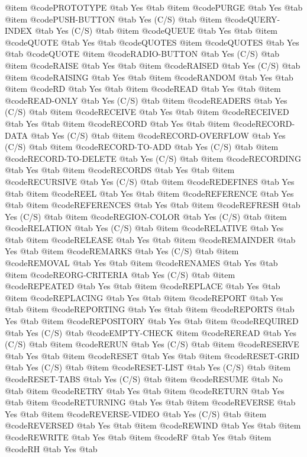 @item @code{PROTOTYPE} @tab Yes @tab 
@item @code{PURGE} @tab Yes @tab 
@item @code{PUSH-BUTTON} @tab Yes	(C/S) @tab 
@item @code{QUERY-INDEX} @tab Yes	(C/S) @tab 
@item @code{QUEUE} @tab Yes @tab 
@item @code{QUOTE} @tab Yes @tab @code{QUOTES}
@item @code{QUOTES} @tab Yes @tab @code{QUOTE}
@item @code{RADIO-BUTTON} @tab Yes	(C/S) @tab 
@item @code{RAISE} @tab Yes @tab 
@item @code{RAISED} @tab Yes	(C/S) @tab 
@item @code{RAISING} @tab Yes @tab 
@item @code{RANDOM} @tab Yes @tab 
@item @code{RD} @tab Yes @tab 
@item @code{READ} @tab Yes @tab 
@item @code{READ-ONLY} @tab Yes	(C/S) @tab 
@item @code{READERS} @tab Yes	(C/S) @tab 
@item @code{RECEIVE} @tab Yes @tab 
@item @code{RECEIVED} @tab Yes @tab 
@item @code{RECORD} @tab Yes @tab 
@item @code{RECORD-DATA} @tab Yes	(C/S) @tab 
@item @code{RECORD-OVERFLOW} @tab Yes	(C/S) @tab 
@item @code{RECORD-TO-ADD} @tab Yes	(C/S) @tab 
@item @code{RECORD-TO-DELETE} @tab Yes	(C/S) @tab 
@item @code{RECORDING} @tab Yes @tab 
@item @code{RECORDS} @tab Yes @tab 
@item @code{RECURSIVE} @tab Yes	(C/S) @tab 
@item @code{REDEFINES} @tab Yes @tab 
@item @code{REEL} @tab Yes @tab 
@item @code{REFERENCE} @tab Yes @tab 
@item @code{REFERENCES} @tab Yes @tab 
@item @code{REFRESH} @tab Yes	(C/S) @tab 
@item @code{REGION-COLOR} @tab Yes	(C/S) @tab 
@item @code{RELATION} @tab Yes	(C/S) @tab 
@item @code{RELATIVE} @tab Yes @tab 
@item @code{RELEASE} @tab Yes @tab 
@item @code{REMAINDER} @tab Yes @tab 
@item @code{REMARKS} @tab Yes	(C/S) @tab 
@item @code{REMOVAL} @tab Yes @tab 
@item @code{RENAMES} @tab Yes @tab 
@item @code{REORG-CRITERIA} @tab Yes	(C/S) @tab 
@item @code{REPEATED} @tab Yes @tab 
@item @code{REPLACE} @tab Yes @tab 
@item @code{REPLACING} @tab Yes @tab 
@item @code{REPORT} @tab Yes @tab 
@item @code{REPORTING} @tab Yes @tab 
@item @code{REPORTS} @tab Yes @tab 
@item @code{REPOSITORY} @tab Yes @tab 
@item @code{REQUIRED} @tab Yes	(C/S) @tab @code{EMPTY-CHECK}
@item @code{REREAD} @tab Yes	(C/S) @tab 
@item @code{RERUN} @tab Yes	(C/S) @tab 
@item @code{RESERVE} @tab Yes @tab 
@item @code{RESET} @tab Yes @tab 
@item @code{RESET-GRID} @tab Yes	(C/S) @tab 
@item @code{RESET-LIST} @tab Yes	(C/S) @tab 
@item @code{RESET-TABS} @tab Yes	(C/S) @tab 
@item @code{RESUME} @tab No @tab 
@item @code{RETRY} @tab Yes @tab 
@item @code{RETURN} @tab Yes @tab 
@item @code{RETURNING} @tab Yes @tab 
@item @code{REVERSE} @tab Yes @tab 
@item @code{REVERSE-VIDEO} @tab Yes	(C/S) @tab 
@item @code{REVERSED} @tab Yes @tab 
@item @code{REWIND} @tab Yes @tab 
@item @code{REWRITE} @tab Yes @tab 
@item @code{RF} @tab Yes @tab 
@item @code{RH} @tab Yes @tab 
